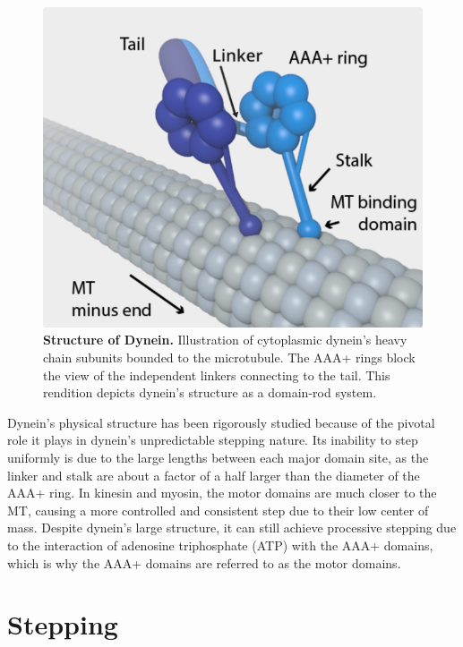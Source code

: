 
\begin{figure}[H]
	\centering
	\includegraphics[width=0.6\columnwidth]{Figures/dynein_on_MT.png}
	\caption[Structure of Dynein]{\textbf{Structure of Dynein.} Illustration of cytoplasmic dynein's heavy chain subunits bounded to the microtubule. The AAA+ rings block the view of the independent linkers connecting to the tail. This rendition depicts dynein’s structure as a domain-rod system. \cite{TheTrappistArt}}
	\label{fig:structure}
\end{figure}

Dynein's physical structure has been rigorously studied because of the pivotal role it plays in dynein's unpredictable stepping nature. Its inability to step uniformly is due to the large lengths between each major domain site, as the linker and stalk are about a factor of a half larger than the diameter of the AAA+ ring. In kinesin and myosin, the motor domains are much closer to the MT, causing a more controlled and consistent step due to their low center of mass. Despite dynein's large structure, it can still achieve processive stepping due to the interaction of adenosine triphosphate (ATP) with the AAA+ domains, which is why the AAA+ domains are referred to as the motor domains.





\section{Stepping}

